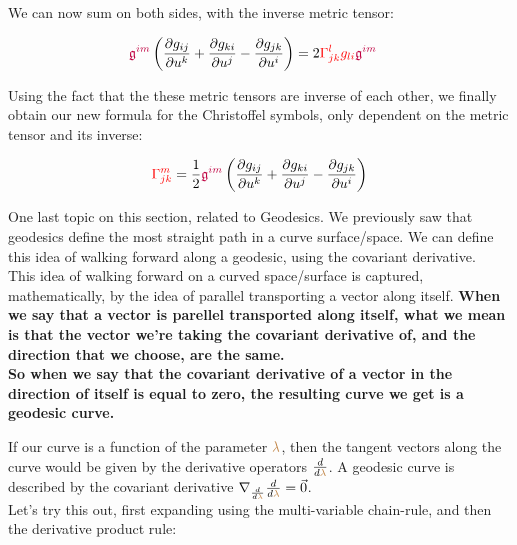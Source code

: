 We can now sum on both sides, with the inverse metric tensor:

\begin{align*}
     \begingroup\color{purple}\mathfrak{g}^{im}\endgroup \left(\frac{\partial g_{ij}}{\partial u^k} + \frac{\partial g_{ki}}{\partial u^j} - \frac{\partial g_{jk}}{\partial u^i}\right) &= 2 \begingroup\color{red}\Gamma^{l}_{jk}\endgroup \begingroup\color{red}g_{li}\endgroup \begingroup\color{purple}\mathfrak{g}^{im}\endgroup
\end{align*}

Using the fact that the these metric tensors are inverse of each other, we finally obtain our new formula for the Christoffel symbols, only dependent on the metric tensor and its inverse:

\begin{equation}
    \begingroup\color{red}\Gamma^{m}_{jk}\endgroup = \frac{1}{2} \begingroup\color{purple}\mathfrak{g}^{im}\endgroup \left(\frac{\partial g_{ij}}{\partial u^k} + \frac{\partial g_{ki}}{\partial u^j} - \frac{\partial g_{jk}}{\partial u^i}\right)
\end{equation}

One last topic on this section, related to Geodesics. We previously saw that geodesics define the most straight path in a curve surface/space.
We can define this idea of walking forward along a geodesic, using the covariant derivative.\\
This idea of walking forward on a curved space/surface is captured, mathematically, by the idea of parallel transporting a vector along itself.
\textbf{When we say that a vector is parellel transported along itself, what we mean is that the vector we're taking the covariant derivative of, 
and the direction that we choose, are the same.}\\

\textbf{So when we say that the covariant derivative of a vector in the direction of itself is equal to zero, the resulting curve we get 
is a geodesic curve.}

If our curve is a function of the parameter $\color{brown}\lambda$, then the tangent vectors along the curve
would be given by the derivative operators $\frac{d}{d\begingroup\color{brown}\lambda\endgroup}$. A geodesic curve is described by the 
covariant derivative $\nabla_{\frac{d}{d\begingroup\color{brown}\lambda\endgroup}}\frac{d}{d\begingroup\color{brown}\lambda\endgroup} = \vec{0}$.\\

Let's try this out, first expanding using the multi-variable chain-rule, and then the derivative product rule:

